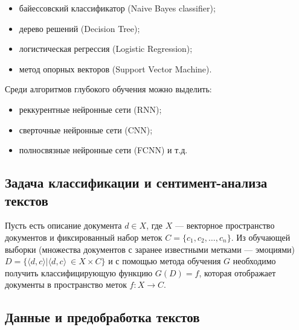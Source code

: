\bigskip
\begin{itemize}
 \item байессовский классификатор (Naive Bayes classifier);
 \item дерево решений (Decision Tree);
 \item логистическая регрессия (Logistic Regression);
 \item метод опорных векторов (Support Vector Machine).
\end{itemize}

\bigskip\par
Среди алгоритмов глубокого обучения можно выделить:
\begin{itemize}
 \item реккурентные нейронные сети (RNN);
 \item сверточные нейронные сети (CNN);
 \item полносвязные нейронные сети (FCNN) и т.д.
\end{itemize}


\subsection{Задача классификации и сентимент-анализа текстов}

Пусть есть описание документа $d \in X$, где $X$ --- векторное пространство документов и фиксированный набор меток $C = \{c_1, c_2, \ldots, c_n\}$. Из обучающей выборки (множества документов с заранее известными метками --- эмоциями) $D = \{\langle d, c \rangle | \langle d, c \rangle\ \in X \times C\}$ и с помощью метода обучения $G$ необходимо получить классифицирующую функцию $G(D) = f$, которая отображает документы в пространство меток $f : X \to C$.


\subsection{Данные и предобработка текстов}





